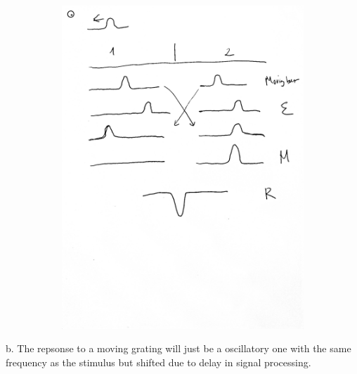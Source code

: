 \documentclass[letterpaper, 11pt]{article}
\begin{document}
\begin{figure}[ht!]
\begin{subfigure}[b]{.45\linewidth}
		\includegraphics[width=\textwidth]{4b.jpg}
	\end{subfigure}
\end{figure}

\newpage

b. The repsonse to a moving grating will just be a oscillatory one with the same frequency as the stimulus but shifted due to delay in signal processing.
\end{document}
